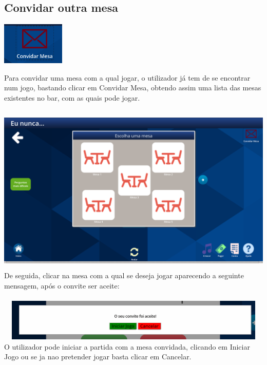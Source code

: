 \documentclass{article}
\begin{document}
\subsection{Convidar outra mesa}
\begin{center}
\includegraphics[width=3cm]{user_manual_images/invite_button.png}
\end{center}
Para convidar uma mesa com a qual jogar, o utilizador já tem de se encontrar num jogo, bastando clicar em Convidar Mesa, obtendo assim uma lista das mesas existentes no bar, com as quais pode jogar.\\\\
\includegraphics[width=15cm, height=8cm]{user_manual_images/invite_table.png}
De seguida, clicar na mesa com a qual se deseja jogar aparecendo a seguinte mensagem, após o convite ser aceite:\\\\
\includegraphics[width=15cm, height=2cm]{user_manual_images/acepted_popup.png}
O utilizador pode iniciar a partida com a mesa convidada, clicando em Iniciar Jogo ou se ja nao pretender jogar basta clicar em Cancelar.
\end{document}
